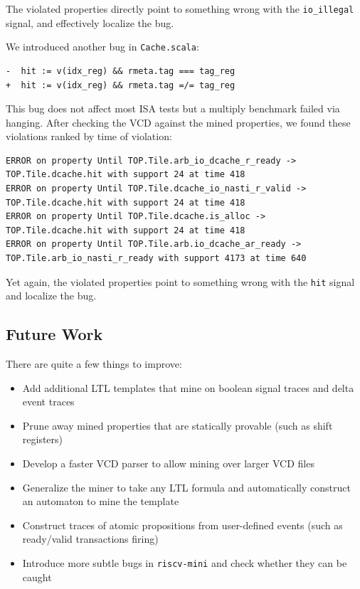 \documentclass[acmlarge,11pt,nonacm]{acmart}
\begin{document}
The violated properties directly point to something wrong with the \texttt{io\_illegal} signal, and effectively localize the bug.

We introduced another bug in \texttt{Cache.scala}:
\begin{verbatim}
-  hit := v(idx_reg) && rmeta.tag === tag_reg
+  hit := v(idx_reg) && rmeta.tag =/= tag_reg
\end{verbatim}

This bug does not affect most ISA tests but a multiply benchmark failed via hanging.
After checking the VCD against the mined properties, we found these violations ranked by time of violation:
\begin{verbatim}
ERROR on property Until TOP.Tile.arb_io_dcache_r_ready -> TOP.Tile.dcache.hit with support 24 at time 418
ERROR on property Until TOP.Tile.dcache_io_nasti_r_valid -> TOP.Tile.dcache.hit with support 24 at time 418
ERROR on property Until TOP.Tile.dcache.is_alloc -> TOP.Tile.dcache.hit with support 24 at time 418
ERROR on property Until TOP.Tile.arb.io_dcache_ar_ready -> TOP.Tile.arb_io_nasti_r_ready with support 4173 at time 640
\end{verbatim}

Yet again, the violated properties point to something wrong with the \texttt{hit} signal and localize the bug.

\subsection{Future Work}
There are quite a few things to improve:
\begin{itemize}
  \item Add additional LTL templates that mine on boolean signal traces and delta event traces
  \item Prune away mined properties that are statically provable (such as shift registers)
  \item Develop a faster VCD parser to allow mining over larger VCD files
  \item Generalize the miner to take any LTL formula and automatically construct an automaton to mine the template
  \item Construct traces of atomic propositions from user-defined events (such as ready/valid transactions firing)
  \item Introduce more subtle bugs in \texttt{riscv-mini} and check whether they can be caught
\end{itemize}
\end{document}
